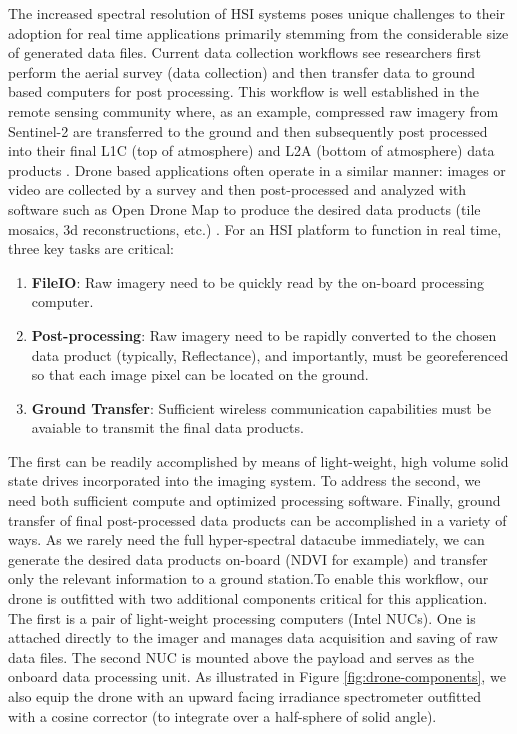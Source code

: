 The increased spectral resolution of HSI systems poses unique challenges to their adoption for real time applications primarily stemming from the considerable size of generated data files. Current data collection workflows see researchers first perform the aerial survey (data collection) and then transfer data to ground based computers for post processing. This workflow is well established in the remote sensing community where, as an example, compressed raw imagery from Sentinel-2 are transferred to the ground and then subsequently post processed into their final L1C (top of atmosphere) and L2A (bottom of atmosphere) data products \cite{sentinel-processing, sentinel-products}. Drone based applications often operate in a similar manner: images or video are collected by a survey and then post-processed and analyzed with software such as Open Drone Map to produce the desired data products (tile mosaics, 3d reconstructions, etc.) \cite{copernicus-odm}. For an HSI platform to function in real time, three key tasks are critical:
\begin{enumerate}
\item \textbf{FileIO}: Raw imagery need to be quickly read by the on-board processing computer.
\item \textbf{Post-processing}: Raw imagery need to be rapidly converted to the chosen data product (typically, Reflectance), and importantly, must be georeferenced so that each image pixel can be located on the ground.
\item \textbf{Ground Transfer}: Sufficient wireless communication capabilities must be avaiable to transmit the final data products.
\end{enumerate}
The first can be readily accomplished by means of light-weight, high volume solid state drives incorporated into the imaging system. To address the second, we need both sufficient compute and optimized processing software. Finally, ground transfer of final post-processed data products can be accomplished in a variety of ways. As we rarely need the full hyper-spectral datacube immediately, we can generate the desired data products on-board (NDVI for example) and transfer only the relevant information to a ground station.To enable this workflow, our drone is outfitted with two additional components critical for this application. The first is a pair of light-weight processing computers (Intel NUCs).  One is attached directly to the imager and manages data acquisition and saving of raw data files. The second NUC is mounted above the payload and serves as the onboard data processing unit. As illustrated in Figure \ref{fig:drone-components}, we also equip the drone with an upward facing irradiance spectrometer outfitted with a cosine corrector (to integrate over a half-sphere of solid angle).
